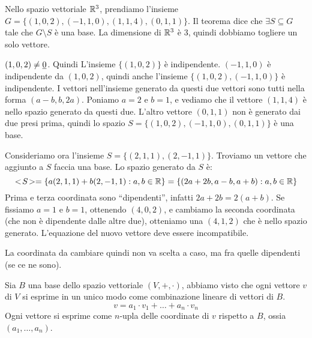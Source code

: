 \begin{exmp}
Nello spazio vettoriale $\mathbb{R}^3$, prendiamo l'insieme $G = \{ (1, 0, 2), (-1, 1, 0), (1, 1, 4), (0, 1, 1) \}$. Il teorema dice che $\exists S \subseteq G$ tale che $G \setminus S$ \`e una base. La dimensione di $\mathbb{R}^3$ \`e 3, quindi dobbiamo togliere un solo vettore.

$(1,0,2) \neq \underline{0}$. Quindi L'insieme $\{ (1, 0, 2) \}$ \`e indipendente. $(-1, 1, 0)$ \`e indipendente da $(1, 0, 2)$, quindi anche l'insieme $\{ (1, 0, 2), (-1, 1, 0)\}$ \`e indipendente. I vettori nell'insieme generato da questi due vettori sono tutti nella forma $(a - b, b, 2a)$. Poniamo $a = 2$ e $b = 1$, e vediamo che il vettore $(1, 1, 4)$ \`e nello spazio generato da questi due. L'altro vettore $(0, 1, 1)$ non \`e generato dai due presi prima, quindi lo spazio $S = \{ (1, 0, 2), (-1, 1, 0), (0, 1, 1)\}$ \`e una base.

Consideriamo ora l'insieme $S = \{ (2, 1, 1), (2, -1, 1) \}$. Troviamo un vettore che aggiunto a $S$ faccia una base. Lo spazio generato da $S$ \`e:
\[
<\!{S}\!> = \{ a (2, 1, 1) + b (2, -1, 1) : a, b \in \mathbb{R} \} = \{ (2a + 2b, a - b, a + b) : a, b \in \mathbb{R} \}
\]
Prima e terza coordinata sono ``dipendenti'', infatti $2a + 2b = 2 (a + b)$. Se fissiamo $a = 1$ e $b = 1$, ottenendo $(4, 0, 2)$, e cambiamo la seconda coordinata (che non \`e dipendente dalle altre due), otteniamo una $(4, 1, 2)$ che \`e nello spazio generato. L'equazione del nuovo vettore deve essere incompatibile.

La  coordinata da cambiare quindi non va scelta a caso, ma fra quelle dipendenti (se ce ne sono). 
\end{exmp}

Sia $B$ una base dello spazio vettoriale $(V, +, \cdot)$, abbiamo visto che ogni vettore $v$ di $V$ si esprime in un unico modo come combinazione lineare di vettori di $B$.
\[
v = a_1 \cdot v_1 + \dots + a_n \cdot v_n
\]
Ogni vettore si esprime come $n$-upla delle coordinate di $v$ rispetto a $B$, ossia $(a_1, \dots, a_n)$.



















